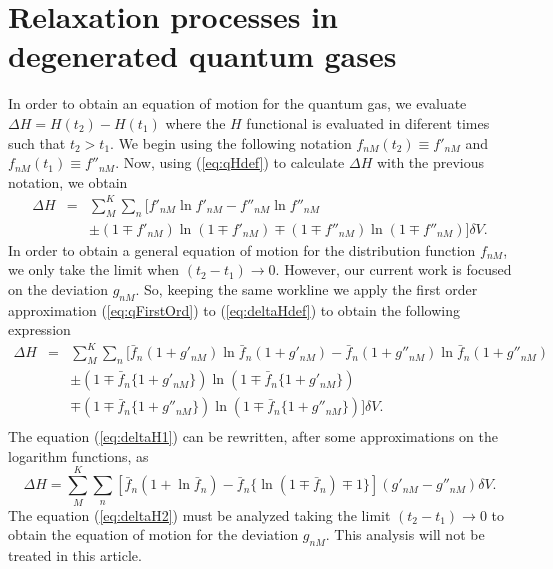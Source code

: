
  \section{Relaxation processes in degenerated quantum gases}\label{sec:relaxproc}
In order to obtain an equation of motion for the quantum gas, we evaluate 
$\Delta H=H(t_2)-H(t_1)$ where the $H$ functional is evaluated in diferent times such that $t_2 > t_1$.
We begin using the following notation $f_{nM}(t_2)\equiv f'_{nM}$ and 
$f_{nM}(t_1) \equiv f''_{nM}$. 
Now, using (\ref{eq:qHdef}) to calculate $\Delta H$ with the previous notation, we obtain
\begin{eqnarray} \label{eq:deltaHdef}
	\Delta H &=& \sum_{M}^{K}\sum_n [f'_{nM} \ln f'_{nM} - f''_{nM}	\ln f''_{nM}\nonumber \\ 
			&&\pm (1\mp f'_{nM}) \ln(1\mp f'_{nM}) \mp (1\mp f''_{nM}) \ln (1\mp f''_{nM})]\delta V.  
\end{eqnarray}
In order to obtain a general equation of motion for the distribution function 
$f_{nM}$, we only take the limit when $(t_2-t_1) \rightarrow 0 $. 
However, our current work is focused on the deviation $g_{nM}$. So, keeping the same workline
we apply the first order approximation (\ref{eq:qFirstOrd}) to (\ref{eq:deltaHdef}) to obtain the following expression
\begin{eqnarray}\label{eq:deltaH1}
	\Delta H &=& \sum_{M}^{K} \sum_n [\bar{f}_n(1+g'_{nM}) \ln \bar{f}_{n}(1+g'_{nM})  -  
			\bar{f}_n(1+g''_{nM}) \ln \bar{f}_n(1+g''_{nM}) \nonumber \\
		    &&  \pm (1 \mp \bar{f}_n \{1+g'_{nM}\}) \ln (1\mp \bar{f}_n\{1+g'_{nM} \})\nonumber \\
		    &&  \mp (1\mp \bar{f}_n \{ 1+g''_{nM} \}) \ln (1\mp \bar{f}_n \{1+g''_{nM} \})]\delta V.\nonumber \\
\end{eqnarray} 
The equation (\ref{eq:deltaH1}) can be rewritten, after some approximations on the logarithm functions, as
\begin{equation}\label{eq:deltaH2}
\Delta H = \sum_{M}^{K}\sum_n [\bar{f}_n(1+\ln \bar{f}_n)-\bar{f}_n \{\ln(1\mp \bar{f}_n)\mp 1 \}](g'_{nM}-g''_{nM})\delta V.
\end{equation}
The equation (\ref{eq:deltaH2}) must be analyzed taking the limit $(t_2-t_1) \rightarrow 0$ 
to obtain the equation of motion for the deviation $g_{nM}$.
This analysis will not be treated in this article. 




  



